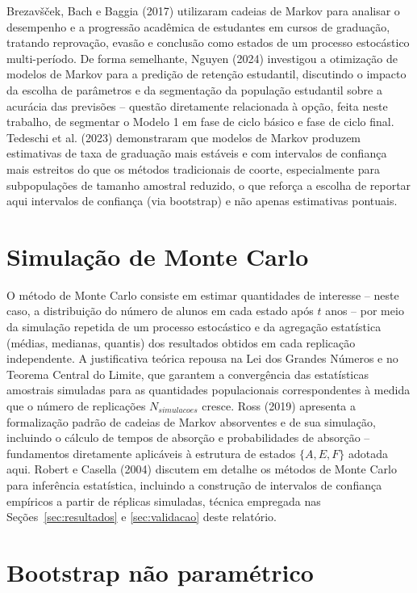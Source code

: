 \documentclass[12pt,times,article,chapter=TITLE]{abnt}
\begin{document}
Brezavšček, Bach e Baggia (2017) utilizaram cadeias de Markov para analisar o desempenho e a progressão acadêmica de estudantes em cursos de graduação, tratando reprovação, evasão e conclusão como estados de um processo estocástico multi-período. De forma semelhante, Nguyen (2024) investigou a otimização de modelos de Markov para a predição de retenção estudantil, discutindo o impacto da escolha de parâmetros e da segmentação da população estudantil sobre a acurácia das previsões -- questão diretamente relacionada à opção, feita neste trabalho, de segmentar o Modelo 1 em fase de ciclo básico e fase de ciclo final. Tedeschi et al. (2023) demonstraram que modelos de Markov produzem estimativas de taxa de graduação mais estáveis e com intervalos de confiança mais estreitos do que os métodos tradicionais de coorte, especialmente para subpopulações de tamanho amostral reduzido, o que reforça a escolha de reportar aqui intervalos de confiança (via bootstrap) e não apenas estimativas pontuais.

\section{Simulação de Monte Carlo}

O método de Monte Carlo consiste em estimar quantidades de interesse -- neste caso, a distribuição do número de alunos em cada estado após $t$ anos -- por meio da simulação repetida de um processo estocástico e da agregação estatística (médias, medianas, quantis) dos resultados obtidos em cada replicação independente. A justificativa teórica repousa na Lei dos Grandes Números e no Teorema Central do Limite, que garantem a convergência das estatísticas amostrais simuladas para as quantidades populacionais correspondentes à medida que o número de replicações $N_{simulacoes}$ cresce. Ross (2019) apresenta a formalização padrão de cadeias de Markov absorventes e de sua simulação, incluindo o cálculo de tempos de absorção e probabilidades de absorção -- fundamentos diretamente aplicáveis à estrutura de estados $\{A, E, F\}$ adotada aqui. Robert e Casella (2004) discutem em detalhe os métodos de Monte Carlo para inferência estatística, incluindo a construção de intervalos de confiança empíricos a partir de réplicas simuladas, técnica empregada nas Seções~\ref{sec:resultados} e \ref{sec:validacao} deste relatório.

\section{Bootstrap não paramétrico}
\label{sec:literatura-bootstrap}
\end{document}
